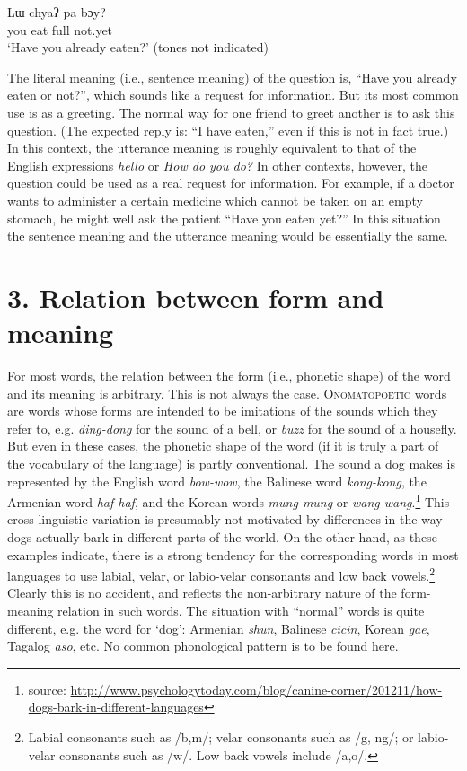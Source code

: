 \ea \label{ex:2}
Lɯ  chyaʔ  pa  bɔy?\\
you  eat  full  not.yet\\
‘Have you already eaten?’  (tones not indicated)
\z


The literal meaning (i.e., sentence meaning) of the question is, “Have you already eaten or not?”, which sounds like a request for information. But its most common use is as a greeting. The normal way for one friend to greet another is to ask this question. (The expected reply is: “I have eaten,” even if this is not in fact true.) In this context, the utterance meaning is roughly equivalent to that of the English expressions \textit{hello} or \textit{How do you do?} In other contexts, however, the question could be used as a real request for information. For example, if a doctor wants to administer a certain medicine which cannot be taken on an empty stomach, he might well ask the patient “Have you eaten yet?” In this situation the sentence meaning and the utterance meaning would be essentially the same.


\section{3. Relation between form and meaning}\label{sec:}

For most words, the relation between the form (i.e., phonetic shape) of the word and its meaning is arbitrary. This is not always the case. \textsc{Onomatopoetic} words are words whose forms are intended to be imitations of the sounds which they refer to, e.g. \textit{ding-dong} for the sound of a bell, or \textit{buzz} for the sound of a housefly. But even in these cases, the phonetic shape of the word (if it is truly a part of the vocabulary of the language) is partly conventional. The sound a dog makes is represented by the English word \textit{bow-wow}, the Balinese word \textit{kong-kong}, the Armenian word \textit{haf-haf}, and the Korean words \textit{mung-mung} or \textit{wang-wang}.\footnote{source: \url{http://www.psychologytoday.com/blog/canine-corner/201211/how-dogs-bark-in-different-languages}} This cross-linguistic variation is presumably not motivated by differences in the way dogs actually bark in different parts of the world. On the other hand, as these examples indicate, there is a strong tendency for the corresponding words in most languages to use labial, velar, or labio-velar consonants and low back vowels.\footnote{Labial consonants such as /b,m/; velar consonants such as /g, ng/; or labio-velar consonants such as /w/. Low back vowels include /a,o/.} Clearly this is no accident, and reflects the non-arbitrary nature of the form-meaning relation in such words. The situation with “normal” words is quite different, e.g. the word for ‘dog’: Armenian \textit{shun}, Balinese \textit{cicin}, Korean \textit{gae}, Tagalog \textit{aso}, etc. No common phonological pattern is to be found here.



